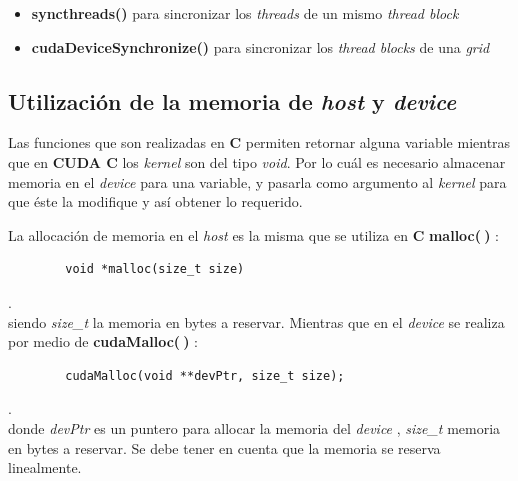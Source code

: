 \begin{itemize}
	\item \textbf{syncthreads()} para sincronizar los \textit{threads} de un mismo \textit{thread block}
	\item \textbf{cudaDeviceSynchronize()} para sincronizar los \textit{thread blocks} de una \textit{grid}
\end{itemize}

\subsection{Utilización de la memoria de \textit{host} y \textit{device}}


Las funciones que son realizadas en \textbf{C} permiten retornar alguna variable mientras que en \textbf{CUDA C} los \textit{kernel} son del tipo \textit{void}. Por lo cuál es necesario almacenar memoria en el \textit{device} para una variable, y pasarla como argumento al \textit{kernel} para que éste la modifique y así obtener lo requerido. 

La allocación de memoria en el \textit{host} es la misma que se utiliza en \textbf{C}  \textbf{malloc($\>$)} :
{\footnotesize
	\begin{frame}{}
		\begin{lstlisting}
		void *malloc(size_t size)
		\end{lstlisting}
		
	\end{frame}
}.
\\
siendo \textit{size\_t} la memoria en bytes a reservar. Mientras que en el \textit{device} se realiza por medio de \textbf{cudaMalloc($\>$)} :
\\
{\footnotesize
\begin{frame}{}
	\begin{lstlisting}
		cudaMalloc(void **devPtr, size_t size);
	\end{lstlisting}

\end{frame}
}.
\\
donde \textit{devPtr} es un puntero para allocar la memoria del \textit{device} , \textit{size\_t} memoria en bytes a reservar. Se debe tener en cuenta que la memoria se reserva linealmente.

